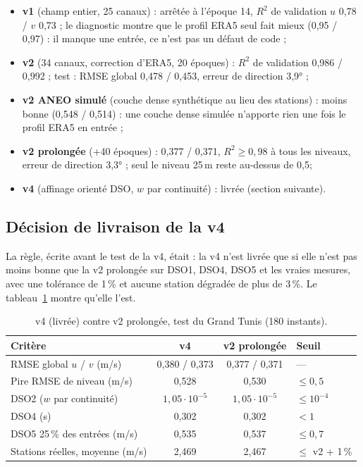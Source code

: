 \begin{itemize}
  \item \textbf{v1} (champ entier, 25 canaux) : arrêtée à l'époque 14, $R^2$ de validation
        $u$ 0,78 / $v$ 0,73 ; le diagnostic montre que le profil ERA5 seul fait mieux (0,95 / 0,97) :
        il manque une entrée, ce n'est pas un défaut de code ;
  \item \textbf{v2} (34 canaux, correction d'ERA5, 20 époques) : $R^2$ de validation 0,986 / 0,992 ;
        test : RMSE global 0,478 / 0,453\ms, erreur de direction 3,9° ;
  \item \textbf{v2 ANEO simulé} (couche dense synthétique au lieu des stations) : moins bonne
        (0,548 / 0,514\ms) : une couche dense simulée n'apporte rien une fois le profil ERA5 en
        entrée ;
  \item \textbf{v2 prolongée} (+40 époques) : 0,377 / 0,371\ms, $R^2 \ge 0{,}98$ à tous les
        niveaux, erreur de direction 3,3° ; seul le niveau 25\,m reste au-dessus de 0,5\ms ;
  \item \textbf{v4} (affinage orienté DSO, $w$ par continuité) : livrée (section suivante).
\end{itemize}

\subsection{Décision de livraison de la v4}
La règle, écrite avant le test de la v4, était : la v4 n'est livrée que si elle n'est pas moins
bonne que la v2 prolongée sur DSO1, DSO4, DSO5 et les vraies mesures, avec une tolérance de 1\,\% et
aucune station dégradée de plus de 3\,\%. Le tableau~\ref{tab:v4} montre qu'elle l'est.

\begin{table}[H]
\centering
\caption{v4 (livrée) contre v2 prolongée, test du Grand Tunis (180 instants).}
\label{tab:v4}
\begin{tabularx}{\linewidth}{@{}Xccl@{}}
\toprule
Critère & v4 & v2 prolongée & Seuil\\
\midrule
RMSE global $u$ / $v$ (m/s) & 0,380 / 0,373 & 0,377 / 0,371 & ---\\
Pire RMSE de niveau (m/s) & 0,528 & 0,530 & $\le 0{,}5$\\
DSO2 ($w$ par continuité) & $1{,}05\cdot10^{-5}$ & $1{,}05\cdot10^{-5}$ & $\le 10^{-4}$\\
DSO4 (s) & 0,302 & 0,302 & $<1$\\
DSO5 25\,\% des entrées (m/s) & 0,535 & 0,537 & $\le 0{,}7$\\
Stations réelles, moyenne (m/s) & 2,469 & 2,467 & $\le$ v2 + 1\,\%\\
\bottomrule
\end{tabularx}
\end{table}


